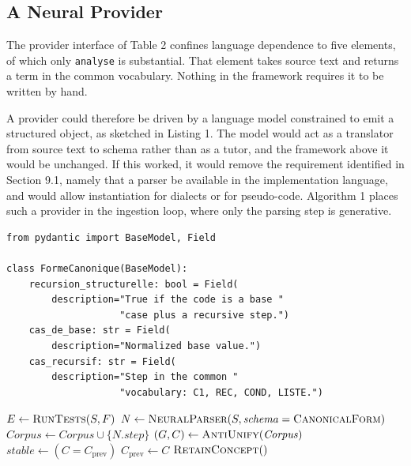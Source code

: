 \documentclass[10pt,twocolumn,letterpaper]{article}
\begin{document}
\subsection{A Neural Provider}
The provider interface of Table 2 confines language dependence to five elements, of which only \texttt{analyse} is substantial. That element takes source text and returns a term in the common vocabulary. Nothing in the framework requires it to be written by hand.

A provider could therefore be driven by a language model constrained to emit a structured object, as sketched in Listing 1. The model would act as a translator from source text to schema rather than as a tutor, and the framework above it would be unchanged. If this worked, it would remove the requirement identified in Section 9.1, namely that a parser be available in the implementation language, and would allow instantiation for dialects or for pseudo-code. Algorithm 1 places such a provider in the ingestion loop, where only the parsing step is generative.

\begin{lstlisting}[float=htbp,basicstyle=\footnotesize\ttfamily,framexleftmargin=2pt,caption={Sketch of a neural provider constrained to the common vocabulary.}]
from pydantic import BaseModel, Field

class FormeCanonique(BaseModel):
    recursion_structurelle: bool = Field(
        description="True if the code is a base "
                    "case plus a recursive step.")
    cas_de_base: str = Field(
        description="Normalized base value.")
    cas_recursif: str = Field(
        description="Step in the common "
                    "vocabulary: C1, REC, COND, LISTE.")
\end{lstlisting}


\begin{algorithm}[t]
\SetAlgoLined
\DontPrintSemicolon
\footnotesize
{}
$E \leftarrow \textsc{RunTests}(S, F)$\;
$N \leftarrow \textsc{NeuralParser}(S, \mathit{schema} = \textsc{CanonicalForm})$\;
$\mathit{Corpus} \leftarrow \mathit{Corpus} \cup \{N.\mathit{step}\}$\;
$(G, C) \leftarrow \textsc{AntiUnify}(\mathit{Corpus})$\;
$\mathit{stable} \leftarrow (C = C_{\mathrm{prev}})$\;
{$C_{\mathrm{prev}} \leftarrow C$\; \Return $\textsc{RetainConcept}()$\;}
\caption{Ingestion loop of the projected hybrid architecture. Only the parsing
step is generative; every decision below it is computed. The algorithm has not
been implemented.}
\end{algorithm}
\end{document}
